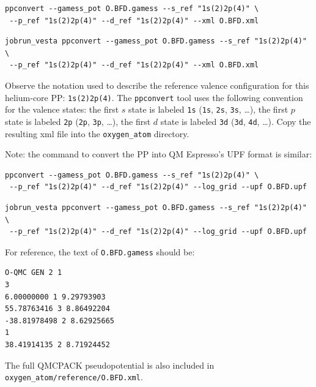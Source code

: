 \noindent
\ifws
\begin{shaded}
\begin{verbatim}
ppconvert --gamess_pot O.BFD.gamess --s_ref "1s(2)2p(4)" \
 --p_ref "1s(2)2p(4)" --d_ref "1s(2)2p(4)" --xml O.BFD.xml
\end{verbatim}
\end{shaded}
\else
\begin{shaded}
\begin{verbatim}
jobrun_vesta ppconvert --gamess_pot O.BFD.gamess --s_ref "1s(2)2p(4)" \
 --p_ref "1s(2)2p(4)" --d_ref "1s(2)2p(4)" --xml O.BFD.xml
\end{verbatim}
\end{shaded}
\fi

\noindent
Observe the notation used to describe the reference valence configuration for this helium-core PP: \texttt{1s(2)2p(4)}.  The \texttt{ppconvert} tool uses the following convention for the valence states: the first $s$ state is labeled \texttt{1s} (\texttt{1s}, \texttt{2s}, \texttt{3s}, \ldots), the first $p$ state is labeled \texttt{2p} (\texttt{2p}, \texttt{3p}, \ldots), the first $d$ state is labeled \texttt{3d} (\texttt{3d}, \texttt{4d}, \ldots). Copy the resulting xml file into the \texttt{oxygen\_atom} directory.

Note: the command to convert the PP into QM Espresso's UPF format is similar:

\noindent
\ifws
\begin{shaded}
\begin{verbatim}
ppconvert --gamess_pot O.BFD.gamess --s_ref "1s(2)2p(4)" \
 --p_ref "1s(2)2p(4)" --d_ref "1s(2)2p(4)" --log_grid --upf O.BFD.upf
\end{verbatim}
\end{shaded}
\else
\begin{shaded}
\begin{verbatim}
jobrun_vesta ppconvert --gamess_pot O.BFD.gamess --s_ref "1s(2)2p(4)" \
 --p_ref "1s(2)2p(4)" --d_ref "1s(2)2p(4)" --log_grid --upf O.BFD.upf
\end{verbatim}
\end{shaded}
\noindent
\fi

For reference, the text of \texttt{O.BFD.gamess} should be:
\begin{lstlisting}
O-QMC GEN 2 1
3
6.00000000 1 9.29793903
55.78763416 3 8.86492204
-38.81978498 2 8.62925665
1
38.41914135 2 8.71924452

\end{lstlisting}
\noindent
The full QMCPACK pseudopotential is also included in \texttt{oxygen\_atom/reference/O.BFD.xml}.


